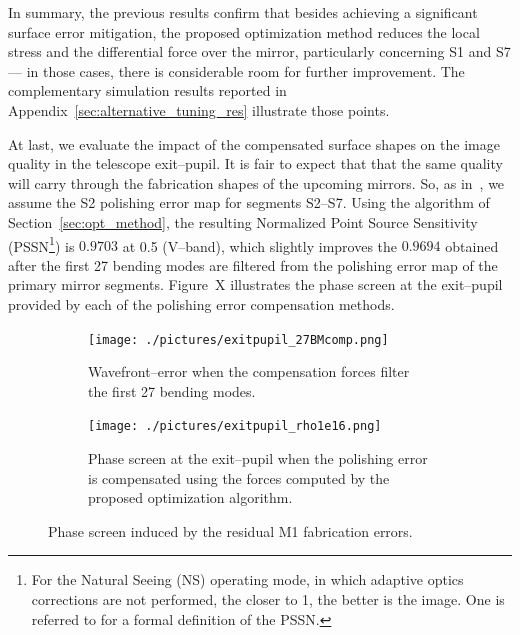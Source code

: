 \documentclass{gmto}
\begin{document}
In summary, the previous results confirm that besides achieving a significant surface error mitigation, the proposed optimization method reduces the local stress and the differential force over the mirror, particularly concerning \textsf{S1} and \textsf{S7} --- in those cases, there is considerable room for further improvement. The complementary simulation results reported in Appendix~\ref{sec:alternative_tuning_res} illustrate those points.


At last, we evaluate the impact of the compensated surface shapes on the image quality in the telescope exit--pupil. It is fair to expect that that the same quality will carry through the fabrication shapes of the upcoming mirrors. So, as in~\cite{GMT_DOC_04637}, we assume the \textsf{S2} polishing error map for segments \textsf{S2}--\textsf{S7}. Using the algorithm of Section~\ref{sec:opt_method}, the resulting Normalized Point Source Sensitivity (PSSN\footnote{
For the Natural Seeing (NS) operating mode, in which adaptive optics corrections are not performed, the closer to 1, the better is the image. One is referred to \cite{seo2009analysis} for a formal definition of the PSSN.
}) is $0.9703$ %
at \SI{0.5}{\micron} (V--band), which slightly improves the $0.9694$ obtained after the first 27 bending modes are filtered from the polishing error map of the primary mirror segments. Figure~X illustrates the phase screen at the exit--pupil provided by each of the polishing error compensation methods.
\begin{figure}[!htb]
\begin{subfigure}[b]{0.452\textwidth}
\centering
\texttt{[image: ./pictures/exitpupil\_27BMcomp.png]}
\caption{Wavefront--error when the compensation forces filter the first 27 bending modes.\\}
\end{subfigure}
\hfill
\begin{subfigure}[b]{0.545\textwidth}
\centering
\texttt{[image: ./pictures/exitpupil\_rho1e16.png]}
\caption{Phase screen at the exit--pupil when the polishing error is compensated using the forces computed by the proposed optimization algorithm.}
\end{subfigure}
\caption{Phase screen induced by the residual M1 fabrication errors.}
\label{fig:exitpupil}
\end{figure}
\end{document}
